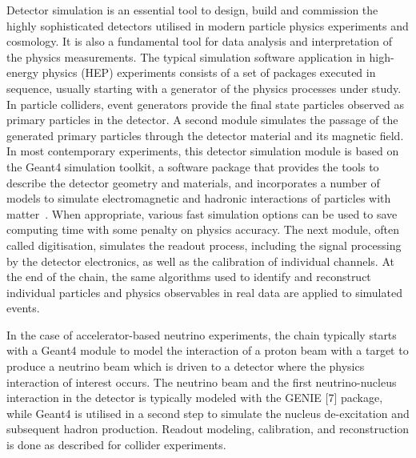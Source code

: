 \documentclass[12pt,a4paper]{article}
\begin{document}
Detector simulation is an essential tool to design, build and commission
the highly sophisticated detectors utilised in modern particle physics
experiments and cosmology. It is also a fundamental tool for data
analysis and interpretation of the physics measurements. The typical
simulation software application in high-energy physics (HEP) experiments
consists of a set of packages executed in sequence, usually starting
with a generator of the physics processes under study. In particle
colliders, event generators provide the final state particles observed
as primary particles in the detector. A second module simulates the
passage of the generated primary particles through the detector material
and its magnetic field. In most contemporary experiments, this detector
simulation module is based on the Geant4 simulation toolkit, a software
package that provides the tools to describe the detector geometry and
materials, and incorporates a number of models to simulate
electromagnetic and hadronic interactions of particles with matter~\cite{ALLISON2016186}. 
When appropriate, various fast simulation options can be used
to save computing time with some penalty on physics accuracy. The next
module, often called digitisation, simulates the readout process,
including the signal processing by the detector electronics, as well as
the calibration of individual channels. At the end of the chain, the
same algorithms used to identify and reconstruct individual particles
and physics observables in real data are applied to simulated events.

In the case of accelerator-based neutrino experiments, the chain
typically starts with a Geant4 module to model the interaction of a
proton beam with a target to produce a neutrino beam which is driven to
a detector where the physics interaction of interest occurs. The
neutrino beam and the first neutrino-nucleus interaction in the detector
is typically modeled with the GENIE {[}7{]} package, while Geant4 is
utilised in a second step to simulate the nucleus de-excitation and
subsequent hadron production. Readout modeling, calibration, and
reconstruction is done as described for collider experiments.
\end{document}
